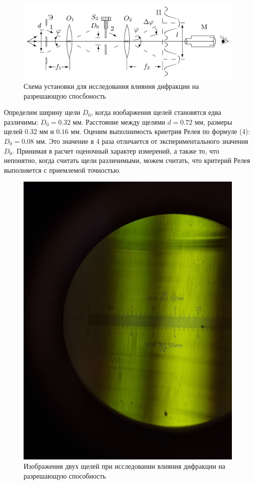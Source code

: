 \documentclass[a4paper,12pt]{article}
\begin{document}
\begin{figure}[H]
    \centering
    \includegraphics[scale=0.3]{lab_3.png}
    \caption{Схема установки для исследования влияния дифракции на разрешающую спосбоность}
\end{figure}

\noindent
Определим ширину щели $D_0$, когда изобаржения щелей становятся едва различимы: $D_0 = 0.32$ мм. Расстояние между щелями $d = 0.72$ мм, размеры щелей $0.32$ мм и $0.16$ мм. Оценим выполнимость криетрия Релея по формуле (4): $D_0 = 0.08$ мм. Это значение в 4 раза отличается от экспериментального значения $D_0$. Принимая в расчет оценочный характер измерений, а также то, что непонятно, когда считать щели различимыми, можем считать, что критерий Релея выполняется с приемлемой точностью.

\begin{figure}[H]
    \centering
    \includegraphics[scale=0.2]{pic_6.png}
    \caption{Изображения двух щелей при исследовании влияния дифракции на разрешающую способность}
\end{figure}
\end{document}

